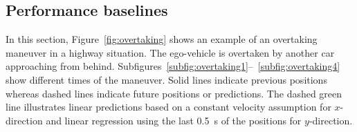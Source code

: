 \subsection{Performance baselines}
\label{subsec:baselines}
In this section, 
Figure~\ref{fig:overtaking} shows an example of an overtaking maneuver in a highway situation.
The ego-vehicle is overtaken by another car approaching from behind.
Subfigures~\ref{subfig:overtaking1}--~\ref{subfig:overtaking4} show different times of the maneuver.
Solid lines indicate previous positions whereas dashed lines indicate future positions or predictions.
The dashed green line illustrates linear predictions based on a constant velocity assumption for $x$-direction and linear regression using the last \SI{0.5}{\second} of the positions for $y$-direction.
\begin{figure}[H]
	\centering
	\vspace{-0.3cm}
	\vspace{-0.3cm}
\end{figure}
